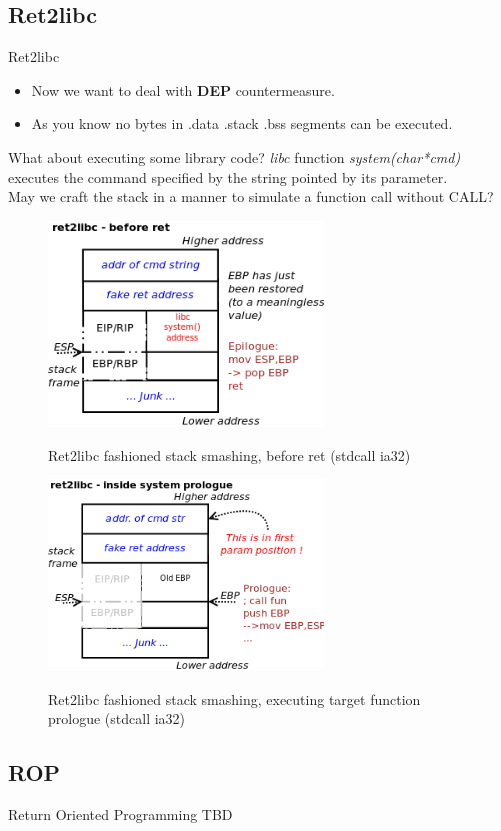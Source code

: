 \subsection{Ret2libc}
\begin{frame}{Ret2libc}

\begin{itemize}
\item Now we want to deal with {\bf DEP} countermeasure.
\item As you know no bytes in .data .stack .bss segments can be executed.
\end{itemize}

\begin{block}{What about executing some library code?}
\emph{libc} function \emph{system(char*cmd)} executes the command specified by the string pointed by its parameter. \\
May we craft the stack in a manner to simulate a function call without CALL?
\end{block}

\framebreak
	\begin{figure}
        \includegraphics[width=0.65\textwidth]{imgs/ret2libc-1.png}
        \label{fig:ret2libc-1}
        \caption{Ret2libc fashioned stack smashing, before ret (stdcall ia32)}
    \end{figure}	
\framebreak
	\begin{figure}
        \includegraphics[width=0.65\textwidth]{imgs/ret2libc-2.png}
        \label{fig:ret2libc-2}
        \caption{Ret2libc fashioned stack smashing, executing target function prologue (stdcall ia32)}
    \end{figure}

\end{frame}

\subsection{ROP}
\begin{frame}{Return Oriented Programming}
	TBD
\end{frame}

